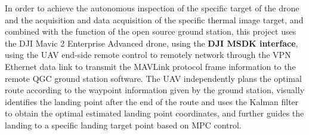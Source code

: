 \begin{enabstract}
In order to achieve the autonomous inspection of the specific target of the drone and the acquisition and data acquisition of the specific thermal image target, and combined with the function of the open source ground station, this project uses the DJI Mavic 2 Enterprise Advanced drone, using the \textbf{DJI MSDK interface}, using the UAV end-side remote control to remotely network through the VPN Ethernet data link to transmit the MAVLink protocol frame information to the remote QGC ground station software. The UAV independently plans the optimal route according to the waypoint information given by the ground station, visually identifies the landing point after the end of the route and uses the Kalman filter to obtain the optimal estimated landing point coordinates, and further guides the landing to a specific landing target point based on MPC control.

\end{enabstract}
